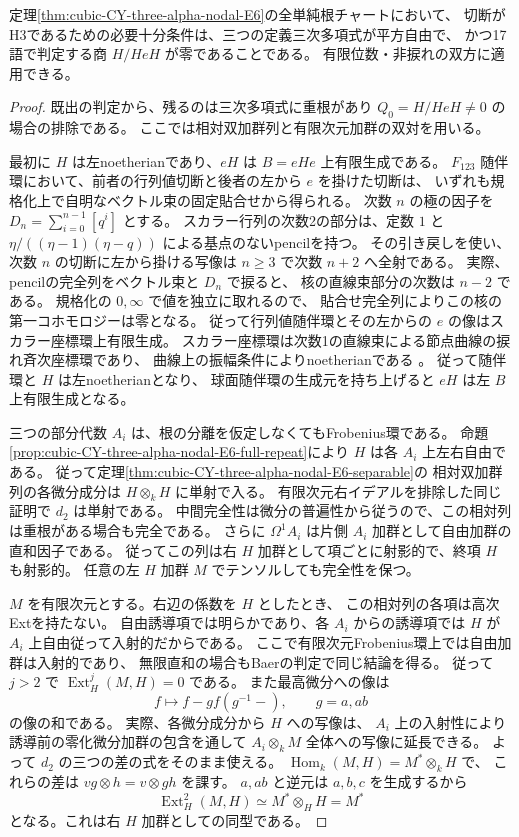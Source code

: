 \begin{theorem}\label{thm:cubic-CY-three-alpha-nodal-E6-complete-corner}
定理\ref{thm:cubic-CY-three-alpha-nodal-E6}の全単純根チャートにおいて、
切断がH3であるための必要十分条件は、三つの定義三次多項式が平方自由で、
かつ17語で判定する商 $H/HeH$ が零であることである。
有限位数・非捩れの双方に適用できる。
\end{theorem}
\begin{proof}
既出の判定から、残るのは三次多項式に重根があり
$Q_0=H/HeH\ne0$ の場合の排除である。
ここでは相対双加群列と有限次元加群の双対を用いる。

最初に $H$ は左noetherianであり、$eH$ は $B=eHe$ 上有限生成である。
$F_{123}$ 随伴環において、前者の行列値切断と後者の左から $e$ を掛けた切断は、
いずれも規格化上で自明なベクトル束の固定貼合せから得られる。
次数 $n$ の極の因子を $D_n=\sum_{i=0}^{n-1}[q^i]$ とする。
スカラー行列の次数2の部分は、定数 $1$ と
$\eta/((\eta-1)(\eta-q))$ による基点のないpencilを持つ。
その引き戻しを使い、次数 $n$ の切断に左から掛ける写像は
$n\ge3$ で次数 $n+2$ へ全射である。
実際、pencilの完全列をベクトル束と $D_n$ で捩ると、
核の直線束部分の次数は $n-2$ である。
規格化の $0,\infty$ で値を独立に取れるので、
貼合せ完全列によりこの核の第一コホモロジーは零となる。
従って行列値随伴環とその左からの $e$ の像はスカラー座標環上有限生成。
スカラー座標環は次数1の直線束による節点曲線の捩れ斉次座標環であり、
曲線上の振幅条件によりnoetherianである
\cite{AVdBTwistedHomogeneous}。
従って随伴環と $H$ は左noetherianとなり、
球面随伴環の生成元を持ち上げると $eH$ は左 $B$ 上有限生成となる。

三つの部分代数 $A_i$ は、根の分離を仮定しなくてもFrobenius環である。
命題\ref{prop:cubic-CY-three-alpha-nodal-E6-full-repeat}により
$H$ は各 $A_i$ 上左右自由である。
従って定理\ref{thm:cubic-CY-three-alpha-nodal-E6-separable}の
相対双加群列の各微分成分は $H\otimes_k H$ に単射で入る。
有限次元右イデアルを排除した同じ証明で $d_2$ は単射である。
中間完全性は微分の普遍性から従うので、この相対列は重根がある場合も完全である。
さらに $\Omega^1 A_i$ は片側 $A_i$ 加群として自由加群の直和因子である。
従ってこの列は右 $H$ 加群として項ごとに射影的で、終項 $H$ も射影的。
任意の左 $H$ 加群 $M$ でテンソルしても完全性を保つ。

$M$ を有限次元とする。右辺の係数を $H$ としたとき、
この相対列の各項は高次Extを持たない。
自由誘導項では明らかであり、各 $A_i$ からの誘導項では
$H$ が $A_i$ 上自由従って入射的だからである。
ここで有限次元Frobenius環上では自由加群は入射的であり、
無限直和の場合もBaerの判定で同じ結論を得る。
従って $j>2$ で $\operatorname{Ext}^j_H(M,H)=0$ である。
また最高微分への像は
\[
 f\longmapsto f-g f(g^{-1}{-}),\qquad g=a,ab
\]
の像の和である。
実際、各微分成分から $H$ への写像は、
$A_i$ 上の入射性により誘導前の零化微分加群の包含を通して
$A_i\otimes_k M$ 全体への写像に延長できる。
よって $d_2$ の三つの差の式をそのまま使える。
$\operatorname{Hom}_k(M,H)=M^*\otimes_k H$ で、
これらの差は $vg\otimes h=v\otimes gh$ を課す。
$a,ab$ と逆元は $a,b,c$ を生成するから
\[
 \operatorname{Ext}^2_H(M,H)\simeq M^*\otimes_H H=M^*
\]
となる。これは右 $H$ 加群としての同型である。


\end{proof}
